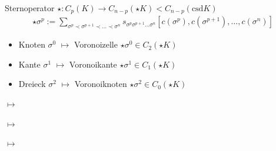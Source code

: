 \documentclass[handout]{beamer}
\newcommand{\csd}{\text{csd}}
\begin{document}
  \begin{frame}
    \begin{block}{Sternoperator \( \star: C_{p}(K) \rightarrow   C_{n-p}(\star K) < C_{n-p}(\csd K) \)}
      \begin{align*}
       \star\sigma^{p} := \sum_{\sigma^{p} \prec \sigma^{p+1} \prec \ldots \prec \sigma^{n}}
                                                   s_{\sigma^{p} \sigma^{p+1} \ldots \sigma^{n}} \left[ c(\sigma^{p}), c(\sigma^{p+1}), \ldots, c(\sigma^{n}) \right]
      \end{align*}
      \begin{itemize}
        \item<2-> Knoten \( \sigma^{0} \) \( \mapsto \) Voronoizelle \( \star\sigma^{0}\in C_{2}(\star K) \)
        \item<3-> Kante \( \sigma^{1} \) \( \mapsto \) Voronoikante \( \star\sigma^{1}\in C_{1}(\star K) \)
        \item<4-> Dreieck \( \sigma^{2} \) \( \mapsto \) Voronoiknoten \( \star\sigma^{2}\in C_{0}(\star K) \)
      \end{itemize}
    \end{block}
    \begin{overprint}
        \begin{minipage}{0.4\textwidth}
          \centering 
        \end{minipage}\hfill
       {\Huge\(\longmapsto\)}  \hfill
       \begin{minipage}{0.4\textwidth}
          \centering 
        \end{minipage}
        \begin{minipage}{0.4\textwidth}
          \centering 
        \end{minipage}\hfill
       {\Huge\(\longmapsto\)}  \hfill
       \begin{minipage}{0.4\textwidth}
          \centering 
        \end{minipage}
        \begin{minipage}{0.4\textwidth}
          \centering 
        \end{minipage}\hfill
       {\Huge\(\longmapsto\)}  \hfill
       \begin{minipage}{0.4\textwidth}
          \centering 
        \end{minipage}
    \end{overprint}
  \end{frame}
\end{document}
